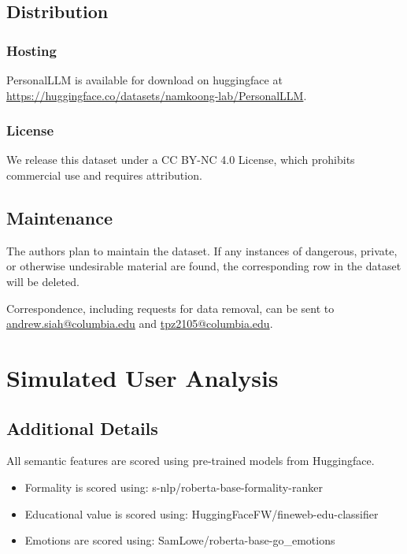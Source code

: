 \subsection{Distribution}

\subsubsection{Hosting}

PersonalLLM is available for download on huggingface at \url{https://huggingface.co/datasets/namkoong-lab/PersonalLLM}.

\subsubsection{License}

We release this dataset under a CC BY-NC 4.0 License, which prohibits commercial use and requires attribution.

\subsection{Maintenance}

The authors plan to maintain the dataset.  If any instances of dangerous, private, or otherwise undesirable material are found, the corresponding row in the dataset will be deleted.

Correspondence, including requests for data removal, can be sent to \url{andrew.siah@columbia.edu} and \url{tpz2105@columbia.edu}.


\section{Simulated User Analysis}\label{app:users}

\subsection{Additional Details}\label{app:user_details}

All semantic features are scored using pre-trained models from Huggingface.

\begin{itemize}
    \item Formality is scored using: s-nlp/roberta-base-formality-ranker
    \item Educational value is scored using: HuggingFaceFW/fineweb-edu-classifier
    \item Emotions are scored using: SamLowe/roberta-base-go\_emotions
\end{itemize}

